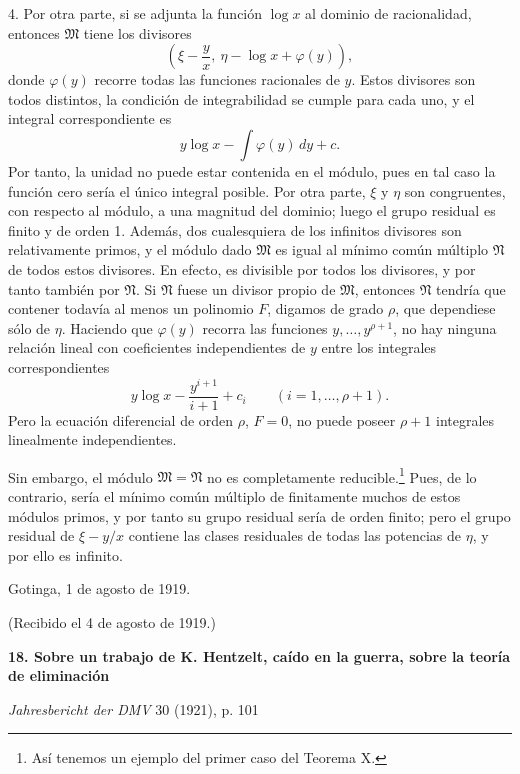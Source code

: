 4. Por otra parte, si se adjunta la función $\log x$ al dominio de racionalidad, entonces $\mathfrak M$ tiene los divisores
\[
 \left(\xi-\frac{y}{x},\ \eta-\log x+\varphi(y)\right),
\]
donde $\varphi(y)$ recorre todas las funciones racionales de $y$. Estos divisores son todos distintos, la condición de integrabilidad se cumple para cada uno, y el integral correspondiente es
\[
 y\log x-\int\varphi(y)\,dy+c.
\]
Por tanto, la unidad no puede estar contenida en el módulo, pues en tal caso la función cero sería el único integral posible. Por otra parte, $\xi$ y $\eta$ son congruentes, con respecto al módulo, a una magnitud del dominio; luego el grupo residual es finito y de orden 1. Además, dos cualesquiera de los infinitos divisores son relativamente primos, y el módulo dado $\mathfrak M$ es igual al mínimo común múltiplo $\mathfrak N$ de todos estos divisores. En efecto, es divisible por todos los divisores, y por tanto también por $\mathfrak N$. Si $\mathfrak N$ fuese un divisor propio de $\mathfrak M$, entonces $\mathfrak N$ tendría que contener todavía al menos un polinomio $F$, digamos de grado $\rho$, que dependiese sólo de $\eta$. Haciendo que $\varphi(y)$ recorra las funciones $y,\ldots,y^{\rho+1}$, no hay ninguna relación lineal con coeficientes independientes de $y$ entre los integrales correspondientes
\[
 y\log x-\frac{y^{i+1}}{i+1}+c_i
 \qquad(i=1,
\ldots,
\rho+1).
\]
Pero la ecuación diferencial de orden $\rho$, $F=0$, no puede poseer $\rho+1$ integrales linealmente independientes.

Sin embargo, el módulo $\mathfrak M=\mathfrak N$ no es completamente reducible.\footnote{Así tenemos un ejemplo del primer caso del Teorema X.} Pues, de lo contrario, sería el mínimo común múltiplo de finitamente muchos de estos módulos primos, y por tanto su grupo residual sería de orden finito; pero el grupo residual de $\xi-y/x$ contiene las clases residuales de todas las potencias de $\eta$, y por ello es infinito.

Gotinga, 1 de agosto de 1919.

\begin{center}
(Recibido el 4 de agosto de 1919.)
\end{center}

\clearpage
\setcounter{footnote}{0}
\begin{center}
{\Large\bfseries 18. Sobre un trabajo de K. Hentzelt, caído en la guerra, sobre la teoría de eliminación}\par
\vspace{1em}
\emph{Jahresbericht der DMV} 30 (1921), p. 101
\end{center}

